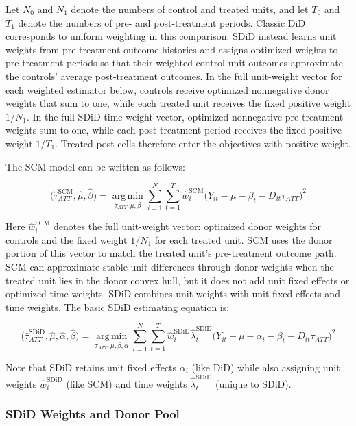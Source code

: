 \documentclass[referee,pdflatex,sn-basic]{sn-jnl}
\theoremstyle{thmstylethree}
\begin{document}
Let \(N_0\) and \(N_1\) denote the numbers of control and treated units, and let \(T_0\) and \(T_1\) denote the numbers of pre- and post-treatment periods. Classic DiD corresponds to uniform weighting in this comparison. SDiD instead learns unit weights from pre-treatment outcome histories and assigns optimized weights to pre-treatment periods so that their weighted control-unit outcomes approximate the controls' average post-treatment outcomes. In the full unit-weight vector for each weighted estimator below, controls receive optimized nonnegative donor weights that sum to one, while each treated unit receives the fixed positive weight \(1/N_1\). In the full SDiD time-weight vector, optimized nonnegative pre-treatment weights sum to one, while each post-treatment period receives the fixed positive weight \(1/T_1\). Treated-post cells therefore enter the objectives with positive weight.

The SCM model can be written as follows:

\[
\bigl(\hat{\tau}_{ATT}^{\text{SCM}}, \hat{\mu}, \hat{\beta}\bigr)
=
\operatorname*{arg\,min}_{\tau_{ATT}, \mu, \beta}
\sum_{i=1}^{N}\sum_{t=1}^{T}
\hat{w}^{\text{SCM}}_i
\bigl(Y_{it}-\mu-\beta_t-D_{it}\tau_{ATT}\bigr)^2
\]

Here \(\hat{w}^{\text{SCM}}_i\) denotes the full unit-weight vector: optimized donor weights for controls and the fixed weight \(1/N_1\) for each treated unit. SCM uses the donor portion of this vector to match the treated unit's pre-treatment outcome path. SCM can approximate stable unit differences through donor weights when the treated unit lies in the donor convex hull, but it does not add unit fixed effects or optimized time weights. SDiD combines unit weights with unit fixed effects and time weights. The basic SDiD estimating equation is:

\[
\bigl(\hat{\tau}_{ATT}^{\text{SDiD}}, \hat{\mu}, \hat{\alpha}, \hat{\beta} \bigr)
=
\operatorname*{arg\,min}_{\tau_{ATT},\mu,\beta, \alpha}
\sum_{i=1}^{N}\sum_{t=1}^{T}
\hat{w}^{\text{SDiD}}_i \hat{\lambda}^{\text{SDiD}}_t
\bigl(Y_{it}- \mu- \alpha_i - \beta_t-D_{it}\tau_{ATT}\bigr)^2
\]

Note that SDiD retains unit fixed effects \(\alpha_i\) (like DiD) while also assigning unit weights \(\hat{w}^{\text{SDiD}}_i\) (like SCM) and time weights \(\hat{\lambda}^{\text{SDiD}}_t\) (unique to SDiD).

\subsubsection{SDiD Weights and Donor Pool}\label{sdid-weights-and-donor-pool}
\end{document}
